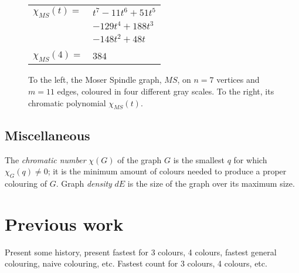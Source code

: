 \documentclass{cslthse-msc}
\newcommand{\density}{dE}
\begin{document}
 \begin{figure}[bt]
 \centering
 \begin{multicols}{2}

\columnbreak

\begin{tabular}{ll}
$\chi_{MS}(t) = $ & $t^7 - 11t^6 + 51t^5 $ \\
& $- 129t^4 + 188t^3$ \\
& $- 148t^2 + 48t $ \\
& \\
$\chi_{MS}(4) = $ & $ 384 $ \\
\end{tabular}

\end{multicols}
  \caption{To the left, the Moser Spindle graph, $MS$, on $n = 7$ vertices and $m = 11$ edges, coloured in four different gray scales. To the right, its chromatic polynomial $\chi_{MS}(t)$.}
  \label{moser}
\end{figure}

\subsection{Miscellaneous}
The \emph{chromatic number} $\chi(G)$ of the graph $G$ is the smallest $q$ for which $\chi_G(q) \neq 0$; it is the minimum amount of colours needed to produce a proper colouring of $G$. Graph \emph{density} $\density{}$ is the size of the graph over its maximum size.

\section{Previous work}
Present some history, present fastest for 3 colours, 4 colours, fastest general colouring, naive colouring, etc. Fastest count for 3 colours, 4 colours, etc.
\end{document}
